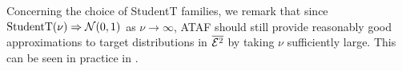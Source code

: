 \documentclass[../../thesis.tex]{subfiles}
\begin{document}
Concerning the choice of StudentT families, we remark that since $\text{StudentT}(\nu) \Rightarrow \mathcal{N}(0,1)$
as $\nu \to \infty$, ATAF should still provide reasonably good approximations to target
distributions in $\overline{\mathcal{E}^2}$ by taking $\nu$ sufficiently large. This can be seen in practice in .






\end{document}
